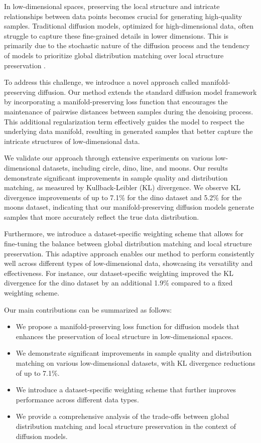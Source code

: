 \documentclass{article} %
\begin{document}
In low-dimensional spaces, preserving the local structure and intricate relationships between data points becomes crucial for generating high-quality samples. Traditional diffusion models, optimized for high-dimensional data, often struggle to capture these fine-grained details in lower dimensions. This is primarily due to the stochastic nature of the diffusion process and the tendency of models to prioritize global distribution matching over local structure preservation \cite{edm}.

To address this challenge, we introduce a novel approach called manifold-preserving diffusion. Our method extends the standard diffusion model framework by incorporating a manifold-preserving loss function that encourages the maintenance of pairwise distances between samples during the denoising process. This additional regularization term effectively guides the model to respect the underlying data manifold, resulting in generated samples that better capture the intricate structures of low-dimensional data.

We validate our approach through extensive experiments on various low-dimensional datasets, including circle, dino, line, and moons. Our results demonstrate significant improvements in sample quality and distribution matching, as measured by Kullback-Leibler (KL) divergence. We observe KL divergence improvements of up to 7.1\% for the dino dataset and 5.2\% for the moons dataset, indicating that our manifold-preserving diffusion models generate samples that more accurately reflect the true data distribution.

Furthermore, we introduce a dataset-specific weighting scheme that allows for fine-tuning the balance between global distribution matching and local structure preservation. This adaptive approach enables our method to perform consistently well across different types of low-dimensional data, showcasing its versatility and effectiveness. For instance, our dataset-specific weighting improved the KL divergence for the dino dataset by an additional 1.9\% compared to a fixed weighting scheme.

Our main contributions can be summarized as follows:
\begin{itemize}
    \item We propose a manifold-preserving loss function for diffusion models that enhances the preservation of local structure in low-dimensional spaces.
    \item We demonstrate significant improvements in sample quality and distribution matching on various low-dimensional datasets, with KL divergence reductions of up to 7.1\%.
    \item We introduce a dataset-specific weighting scheme that further improves performance across different data types.
    \item We provide a comprehensive analysis of the trade-offs between global distribution matching and local structure preservation in the context of diffusion models.
\end{itemize}
\end{document}
